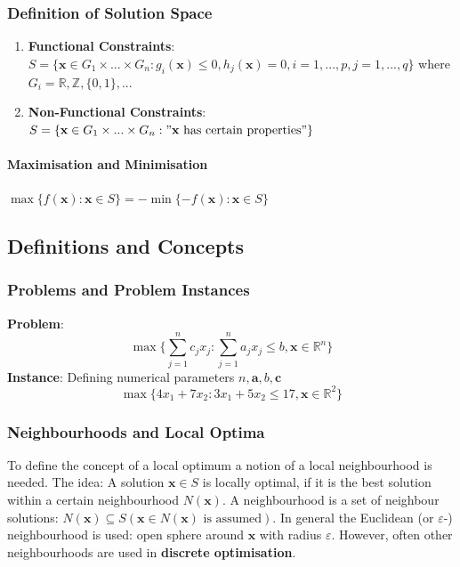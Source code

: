 \documentclass[11pt]{article}
\begin{document}
\subsubsection{Definition of Solution Space}
\begin{enumerate}[label=\roman*)]
	\item \textbf{Functional Constraints}:\\
	$S = \{ \textbf{x}\in G_1\times...\times G_n : g_i(\textbf{x})\leq 0, h_j (\textbf{x}) = 0, i=1,...,p,j=1,...,q \}$ where $G_i = \mathbb{R},\mathbb{Z},\{0,1\},...$
	\item \textbf{Non-Functional Constraints}:\\
	$S = \{ \textbf{x}\in G_1\times...\times G_n : "\textbf{x} \text{ has certain properties}" \} $
\end{enumerate}

\paragraph{Maximisation and Minimisation} $\max\{f(\textbf{x}):\textbf{x}\in S\} = - \min\{-f(\textbf{x}):\textbf{x}\in S\}$

\subsection{Definitions and Concepts}

\subsubsection{Problems and Problem Instances}
\textbf{Problem}:
\begin{equation*}
	\max\{\sum_{j=1}^{n}c_j x_j:\sum_{j=1}^{n}a_j x_j \leq b, \textbf{x}\in \mathbb{R}^n\}
\end{equation*}
\noindent
\textbf{Instance}: Defining numerical parameters $n,\textbf{a},b,\textbf{c}$
\begin{equation*}
\max\{4x_1 + 7 x_2 : 3x_1 + 5 x_2 \leq 17, \textbf{x}\in \mathbb{R}^2\}
\end{equation*}

\subsubsection{Neighbourhoods and Local Optima}
To define the concept of a local optimum a notion of a local neighbourhood is needed. The idea: A solution $\textbf{x}\in S$ is locally optimal, if it is the best solution within a certain neighbourhood $N(\textbf{x})$. A neighbourhood is a set of neighbour solutions: $N(\textbf{x})\subseteq S (\textbf{x} \in N(\textbf{x})\text{ is assumed})$. In general the Euclidean (or $\varepsilon$-) neighbourhood is used: open sphere around $\textbf{x}$ with radius $\varepsilon$. However, often other neighbourhoods are used in \textbf{discrete optimisation}.
\end{document}
